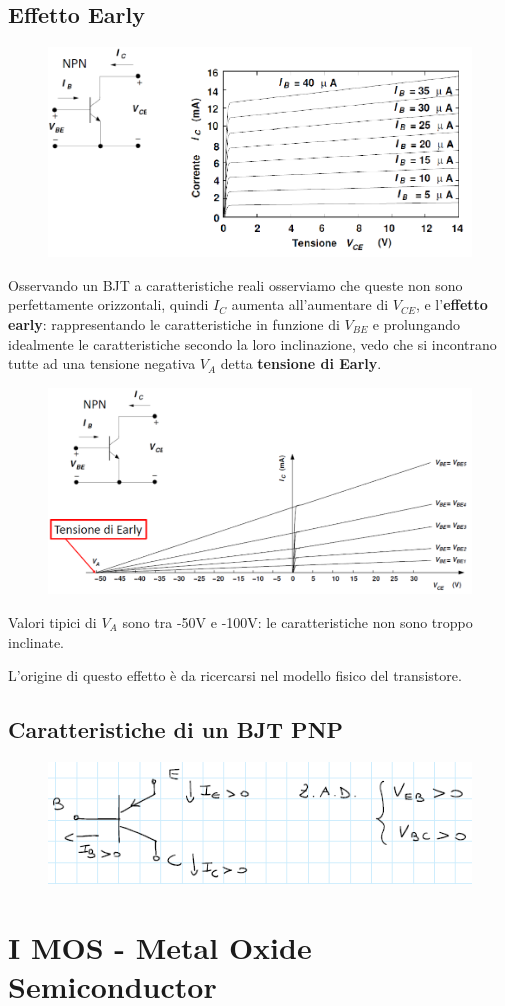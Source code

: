 \documentclass[11pt,a4paper,]{article}
\begin{document}
\subsection{Effetto Early}
\begin{figure}[H]
    \centering
    \includegraphics[width=0.5\linewidth]{img/eff early.png}
\end{figure}
Osservando un BJT a caratteristiche reali osserviamo che queste non sono perfettamente orizzontali, quindi $I_C$ aumenta all'aumentare di $V_{CE}$, e l'\textbf{effetto early}: rappresentando le caratteristiche in funzione di $V_{BE}$ e prolungando idealmente le caratteristiche secondo la loro inclinazione, vedo che si incontrano tutte ad una tensione negativa $V_A$ detta \textbf{tensione di Early}.
\begin{figure}[H]
    \centering
    \includegraphics[width=0.5\linewidth]{img/tons early.png}
\end{figure}
Valori tipici di $V_A$ sono tra -50V e -100V: le caratteristiche non sono troppo inclinate.

L'origine di questo effetto è da ricercarsi nel modello fisico del transistore.
\subsection{Caratteristiche di un BJT PNP}
\begin{figure}[H]
    \centering
    \includegraphics[width=0.5\linewidth]{img/car pnp.png}
\end{figure}

\section{I MOS - Metal Oxide Semiconductor}
\end{document}
